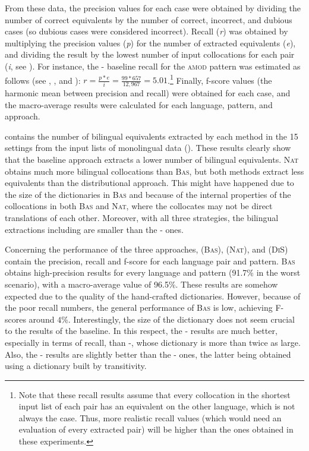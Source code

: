 \documentclass[output=paper,modfonts,nonflat]{langsci/langscibook}
\begin{document}
From these data, the precision values for each case were obtained by dividing the number of
correct  equivalents by the number of correct, incorrect, and dubious cases (so dubious
cases were considered incorrect). Recall (\textit{r}) was obtained by multiplying the precision values (\textit{p})
for the number of extracted equivalents (\textit{e}), and dividing the result by the lowest number of input collocations
for each pair (\textit{i}, see ). For instance, the - baseline recall for the \textsc{amod}
pattern was estimated as follows (see , , and ):
$r = \frac{p * e}{i} = \frac{99 * 657}{12,967} = 5.01$.\footnote{Note that these recall results assume that
  every collocation in the shortest input list of each pair has an equivalent on the other language,
  which is not always the case. Thus, more realistic recall values (which would need an
  evaluation of every extracted pair) will be higher than the ones obtained in these experiments.}
Finally, f-score values (the harmonic mean between precision and recall) were obtained
for each case, and the macro-average results were calculated for each language, pattern, and approach.

 contains the number of bilingual  equivalents extracted by
each method in the 15 settings from the input lists of monolingual data ().
These results clearly show that the baseline approach extracts a lower number of bilingual equivalents.
\textsc{Nat} obtains much more bilingual collocations than \textsc{Bas}, but both methods
extract less equivalents than the distributional approach. This might have happened due to the
size of the dictionaries in \textsc{Bas} and because of the internal properties of the collocations
in both \textsc{Bas} and \textsc{Nat}, where the collocates may not be direct translations
of each other. Moreover, with all three strategies, the bilingual extractions
including  are smaller than the - ones.

Concerning the performance of the three approaches,  (\textsc{Bas}),
 (\textsc{Nat}), and  (\textsc{DiS}) contain the precision,
recall and f-score for each language pair and  pattern.
\textsc{Bas} obtains high-precision results for every language and 
pattern (91.7\% in the worst scenario), with a macro-average value of 96.5\%. These
results are somehow expected due to the quality of the hand-crafted dictionaries. However,
because of the poor recall numbers, the general performance of \textsc{Bas} is low,
achieving F-scores around $4\%$. Interestingly, the size of the dictionary
does not seem crucial to the results of the baseline. In this respect, the
- results are much better, especially in terms of recall, than -, whose
dictionary is more than twice as large. Also, the - results are slightly
better than the - ones, the latter being obtained using a dictionary
built by transitivity.
\end{document}
